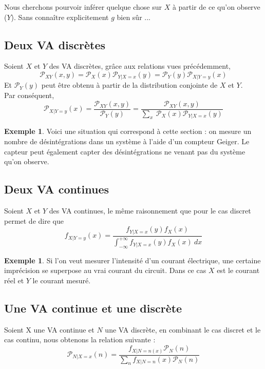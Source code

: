 \documentclass[a4paper,12pt]{report}
\theoremstyle{definition}
\renewcommand{\(}{\left(}
\renewcommand{\)}{\right)}
\renewcommand{\P}{\mathcal{P}}
\newtheorem{exmp}[thm]{Exemple}
\begin{document}
        Nous cherchons pourvoir inférer quelque chose sur $X$ à partir de ce qu'on observe ($Y$). Sans connaître explicitement $g$ bien sûr ...
        
        \subsection{Deux VA discrètes}
            
            Soient $X$ et $Y$ des VA discrètes, grâce aux relations vues précédemment, 
            $$\P_{XY}(x,y) = \P_X(x)\P_{Y|X=x}(y) = \P_Y(y)\P_{X|Y=y}(x)$$
            Et $\P_Y(y)$ peut être obtenu à partir de la distribution conjointe de $X$ et $Y$. \\
            Par conséquent,
            $$\P_{X|Y=y}(x) = \frac{\P_{XY}(x,y)}{\P_Y(y)}=\frac{\P_{XY}(x,y)}{\sum_x~\P_X(x)\P_{Y|X=x}(y) }$$
            
            \begin{exmp}
                Voici une situation qui correspond à cette section : on mesure un nombre de désintégrations dans un système à l'aide d'un compteur Geiger. Le capteur peut également capter des désintégrations ne venant pas du système qu'on observe.
            \end{exmp}
        
        \subsection{Deux VA continues}
        
            Soient $X$ et $Y$ des VA continues, le même raisonnement que pour le cas discret permet de dire que
            $$f_{X|Y=y}(x) =\frac{f_{Y|X=x}(y)f_X(x)}{\int_{-\infty}^{+\infty}f_{Y|X=x}(y)f_X(x)~dx}
            $$
        
            \begin{exmp}
                Si l'on veut mesurer l'intensité d'un courant électrique, une certaine imprécision se superpose au vrai courant du circuit. Dans ce cas $X$ est le courant réel et $Y$ le courant mesuré.
            \end{exmp}
        
        \subsection{Une VA continue et une discrète}
        
            Soient X une VA continue et $N$ une VA discrète, en combinant le cas discret et le cas continu, nous obtenons la relation suivante :
            $$\P_{N|X=x}(n) = \frac{f_{X|N=n(x)}\P_N(n)}{\sum_n f_{X|N=n}(x)\P_N(n)}$$
        
\end{document}
